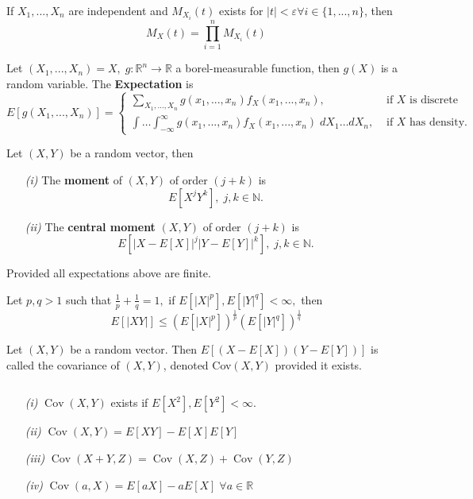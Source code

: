\documentclass{tufte-handout}
\DeclareMathOperator{\cov}{Cov}
\begin{document}
\begin{remark} 
  If $X_1, ..., X_n$ are independent and $M_{X_i}(t)$ exists for $| t| < \varepsilon \forall i \in \{1,..., n\}$, then 
  $$M_X(t) = \prod_{i = 1}^n M_{X_i} (t) $$
\end{remark}
\begin{definition}
  Let $(X_1,..., X_n) = X,\; g: \mathbb{R}^n \to \mathbb{R}$ a borel-measurable function, then $g(X)$ is a random variable. The \textbf{Expectation} is 
  $$E[g(X_1,...,X_n)]=  
  \begin{cases}
    \sum^{  }_{X_1, ...,X_n} g(x_1,...,x_n)f_X(x_1,...,x_n), &\text{ if $X$ is discrete } \\
    \int \hdots \int_{-\infty}^\infty g(x_1,...,x_n)f_X(x_1,...,x_n) \; d{X_1} \hdots dX_n, &\text{ if $X$ has density.}
  \end{cases}$$
\end{definition}
\begin{definition}
  Let $(X,Y)$ be a random vector, then 
  \begin{enumerate}
    \item[\it (i)] The \textbf{moment} of $(X,Y)$ of order $(j+k)$ is$$E[X^jY^k],\; j,k \in \mathbb{N}.$$ 
    \item[\it (ii)] The \textbf{central moment} $(X,Y)$ of order $(j+k)$ is $$E[|X - E[X]|^j | Y- E[Y]|^k], \; j,k \in \mathbb{N}. $$
  \end{enumerate}
 Provided all expectations above are finite.  
\end{definition}
\begin{theorem}
  Let $p,q > 1$ such that $\frac{1}{p} + \frac{1}{q} = 1,$ if $E[|X|^p], E[|Y|^q] < \infty, $ then 
  $$E[|XY|] \leq (E[|X|^p])^{\frac{1}{p}}(E[|Y|^q])^{\frac{1}{q} } $$
\end{theorem}
\begin{definition}[Covariance]
  Let $(X, Y )$ be a random vector. Then $E[(X − E[X])(Y − E[Y] )]$ is called the covariance of $(X, Y )$, denoted Cov$(X, Y )$ provided it exists.
\end{definition}
\begin{lemma}
  $  $\newline
  \begin{enumerate}
    \item[\it (i)] $\cov(X,Y)$ exists if $E[X^2], E[Y^2]< \infty.$
    \item[\it (ii)] $\cov(X,Y) = E[XY]- E[X]E[Y]$ 
   \item[\it (iii)] $\cov (X+ Y , Z) = \cov (X,Z) + \cov (Y, Z)$
    \item[\it (iv)] $\cov (a, X) = E[aX] -a E[X] \; \forall a \in \mathbb{R}$ 
  \end{enumerate}
\end{lemma}
\end{document}
